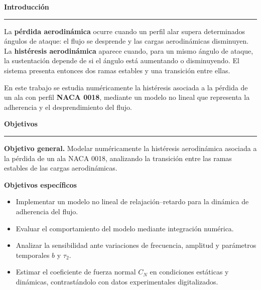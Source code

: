 \documentclass[final]{article}
\newcommand{\headingfont}{\sffamily}
\newcommand{\cuerpo}{\fontsize{22.5}{28.5}\selectfont}
\newcommand{\bloque}[1]{%
  \par\vspace{0.10cm}%
  \begin{center}
    {\headingfont\bfseries\color{utecNavy}\fontsize{29}{34}\selectfont #1}
  \end{center}%
  \vspace{-0.44cm}%
  {\color{utecNavy}\rule{\linewidth}{1.1pt}}\par
  \vspace{0.34cm}%
}
\begin{document}
\noindent
\begin{minipage}[t]{37.44cm}
\vspace{0pt}
\cuerpo
\raggedright

\bloque{Introducción}

La \textbf{pérdida aerodinámica} ocurre cuando un perfil alar supera
determinados ángulos de ataque: el flujo se desprende y las cargas
aerodinámicas disminuyen. La \textbf{histéresis aerodinámica} aparece cuando,
para un mismo ángulo de ataque, la sustentación depende de si el ángulo está
aumentando o disminuyendo. El sistema presenta entonces dos ramas estables y
una transición entre ellas.

En este trabajo se estudia numéricamente la histéresis asociada a la pérdida
de un ala con perfil \textbf{NACA 0018}, mediante un modelo no lineal que
representa la adherencia y el desprendimiento del flujo.

\bloque{Objetivos}

\textbf{Objetivo general.} Modelar numéricamente la histéresis aerodinámica
asociada a la pérdida de un ala NACA 0018, analizando la transición entre las
ramas estables de las cargas aerodinámicas.

\vspace{0.12cm}
\textbf{Objetivos específicos}
\begin{itemize}[leftmargin=0.80cm, itemsep=0.16cm, topsep=0.12cm,
                  label=\textcolor{utecCyan}{\textbullet}]
  \item Implementar un modelo no lineal de relajación--retardo para la
        dinámica de adherencia del flujo.
  \item Evaluar el comportamiento del modelo mediante integración numérica.
  \item Analizar la sensibilidad ante variaciones de frecuencia, amplitud y
        parámetros temporales $b$ y $\tau_2$.
  \item Estimar el coeficiente de fuerza normal $C_N$ en condiciones estáticas
        y dinámicas, contrastándolo con datos experimentales digitalizados.
\end{itemize}

\vspace{0.30cm}


\end{minipage}
\end{document}
